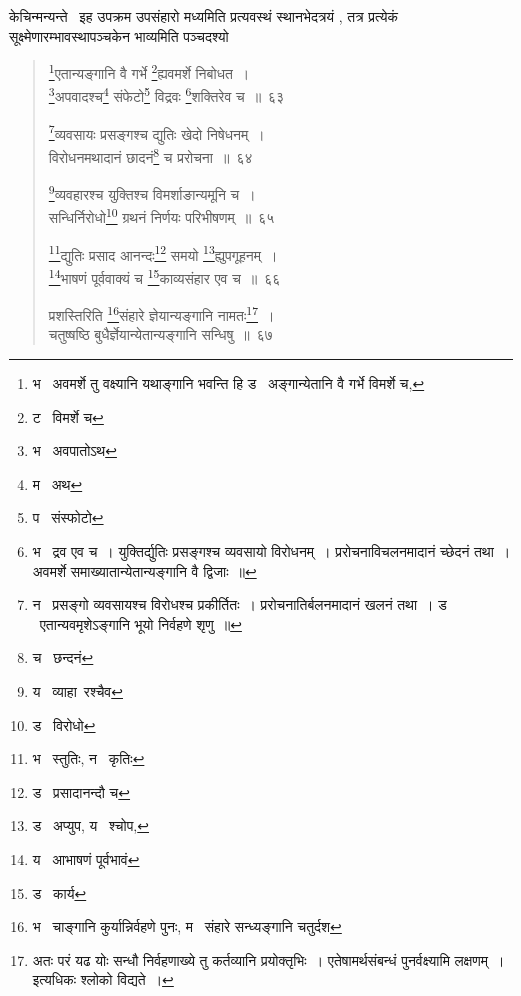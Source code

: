 \documentclass[11pt, openany]{book}
\begin{document}
केचिन्मन्यन्ते \textendash\ इह उपक्रम उपसंहारो मध्यमिति प्रत्यवस्थं स्थानभेदत्रयं , तत्र प्रत्येकं सूक्ष्मेणारम्भावस्थापञ्चकेन भाव्यमिति पञ्चदश्यो

\newpage

\begin{quote}
{\na \renewcommand{\thefootnote}{1}\footnote{भ \textendash\ अवमर्शे तु वक्ष्यानि यथाङ्गानि भवन्ति हि ड \textendash\ अङ्गान्येतानि वै गर्भे विमर्शे च,}एतान्यङ्गानि वै गर्भे \renewcommand{\thefootnote}{2}\footnote{ट \textendash\ विमर्शे च}ह्यवमर्शे निबोधत~।\\
\renewcommand{\thefootnote}{3}\footnote{भ \textendash\ अवपातोऽथ}अपवादश्च\renewcommand{\thefootnote}{4}\footnote{म \textendash\ अथ} संफेटो\renewcommand{\thefootnote}{5}\footnote{प \textendash\ संस्फोटो} विद्रवः \renewcommand{\thefootnote}{6}\footnote{भ \textendash\ द्रव एव च~। युक्तिर्द्युतिः प्रसङ्गश्च व्यवसायो विरोधनम्~। प्ररोचनाविचलनमादानं च्छेदनं तथा~। अवमर्शे समाख्यातान्येतान्यङ्गानि वै द्विजाः~॥}शक्तिरेव च~॥~६३

\renewcommand{\thefootnote}{7}\footnote{न \textendash\ प्रसङ्गो व्यवसायश्च विरोधश्च प्रकीर्तितः~। प्ररोचनातिर्बलनमादानं खलनं तथा~। ड \textendash\ एतान्यवमृशेऽङ्गानि भूयो निर्वहणे शृणु~॥}व्यवसायः प्रसङ्गश्च द्युतिः खेदो निषेधनम्~।\\
विरोधनमथादानं छादनं\renewcommand{\thefootnote}{8}\footnote{च \textendash\ छन्दनं} च प्ररोचना~॥~६४

\renewcommand{\thefootnote}{9}\footnote{य \textendash\ व्याहा\textendash\ रश्चैव}व्यवहारश्च युक्तिश्च विमर्शाङान्यमूनि च~।\\
सन्धिर्निरोधो\renewcommand{\thefootnote}{10}\footnote{ड \textendash\ विरोधो} ग्रथनं निर्णयः परिभीषणम्~॥~६५

\renewcommand{\thefootnote}{11}\footnote{भ \textendash\ स्तुतिः, न \textendash\ कृतिः}द्युतिः प्रसाद आनन्दः\renewcommand{\thefootnote}{12}\footnote{ड \textendash\ प्रसादानन्दौ च} समयो \renewcommand{\thefootnote}{13}\footnote{ड \textendash\ अप्युप, य \textendash\ श्चोप,}ह्युपगूहनम्~।\\
\renewcommand{\thefootnote}{14}\footnote{य \textendash\ आभाषणं पूर्वभावं}भाषणं पूर्ववाक्यं च \renewcommand{\thefootnote}{15}\footnote{ड \textendash\ कार्य}काव्यसंहार एव च~॥~६६

प्रशस्तिरिति \renewcommand{\thefootnote}{16}\footnote{भ \textendash\ चाङ्गानि कुर्यान्निर्वहणे पुनः, म \textendash\ संहारे सन्ध्यङ्गानि चतुर्दश}संहारे ज्ञेयान्यङ्गानि नामतः\renewcommand{\thefootnote}{17}\footnote{अतः परं यढ योः {\qt सन्धौ निर्वहणाख्ये तु कर्तव्यानि प्रयोक्तृभिः~। एतेषामर्थसंबन्धं पुनर्वक्ष्यामि लक्षणम्~।} इत्यधिकः श्लोको विद्यते~।}~।\\
चतुष्षष्ठि बुधैर्ज्ञेयान्येतान्यङ्गानि सन्धिषु~॥~६७}
\end{quote}
\end{document}
